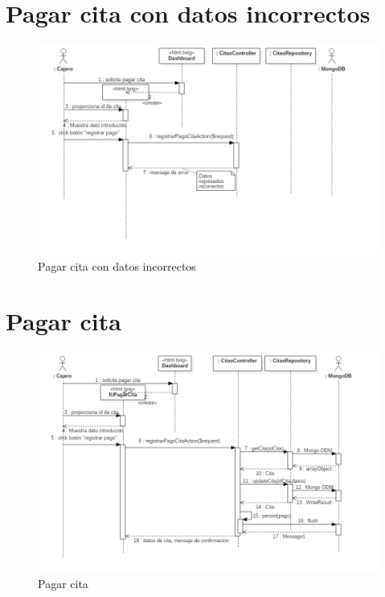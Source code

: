 \section{Pagar cita con datos incorrectos}

\begin{figure}[htbp!]
	\centering
	\includegraphics[width=1\textwidth]{uml/DiagramasSecuencia/DavidPacheco/pagar-cita-datos-incorrectos}
	\caption{Pagar cita con datos incorrectos}
\end{figure}

\section{ Pagar cita}

\begin{figure}[htbp!]
	\centering
	\includegraphics[width=1\textwidth]{uml/DiagramasSecuencia/DavidPacheco/pagar-cita}
	\caption{Pagar cita}
\end{figure}

